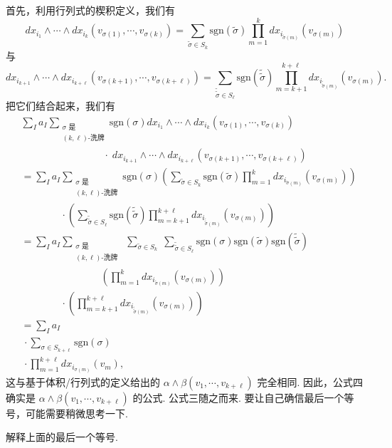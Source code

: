 首先，利用行列式的楔积定义，我们有
\[
dx_{i_1}\wedge\cdots\wedge dx_{i_k}(v_{\sigma(1)},\cdots,v_{\sigma(k)})
=\sum_{\tilde{\sigma}\in S_k}\mathrm{sgn}(\tilde{\sigma})\prod_{m=1}^{k}dx_{i_{\tilde{\sigma}(m)}}(v_{\sigma(m)})
\]
与
\[
dx_{i_{k+1}}\wedge\cdots\wedge dx_{i_{k+\ell}}(v_{\sigma(k+1)},\cdots,v_{\sigma(k+\ell)})
=\sum_{\tilde{\tilde{\sigma}}\in S_\ell}\mathrm{sgn}(\tilde{\tilde{\sigma}})\prod_{m=k+1}^{k+\ell}dx_{i_{\tilde{\tilde{\sigma}}(m)}}(v_{\sigma(m)}).
\]
把它们结合起来，我们有
\begin{align*}
&\sum_{I}a_I\sum_{\substack{\sigma\text{ 是}\\ (k,\ell)\text{-洗牌}}}\mathrm{sgn}(\sigma)
dx_{i_1}\wedge\cdots\wedge dx_{i_k}(v_{\sigma(1)},\cdots,v_{\sigma(k)})\\
&\qquad\qquad\qquad\qquad\;\cdot\;dx_{i_{k+1}}\wedge\cdots\wedge dx_{i_{k+\ell}}(v_{\sigma(k+1)},\cdots,v_{\sigma(k+\ell)})\\
&=\sum_{I}a_I\sum_{\substack{\sigma\text{ 是}\\ (k,\ell)\text{-洗牌}}}\mathrm{sgn}(\sigma)
\left(\sum_{\tilde{\sigma}\in S_k}\mathrm{sgn}(\tilde{\sigma})\prod_{m=1}^{k}dx_{i_{\tilde{\sigma}(m)}}(v_{\sigma(m)})\right)\\
&\qquad\qquad\cdot
\left(\sum_{\tilde{\tilde{\sigma}}\in S_\ell}\mathrm{sgn}(\tilde{\tilde{\sigma}})\prod_{m=k+1}^{k+\ell}dx_{i_{\tilde{\tilde{\sigma}}(m)}}(v_{\sigma(m)})\right)\\
&=\sum_{I}a_I\sum_{\substack{\sigma\text{ 是}\\ (k,\ell)\text{-洗牌}}}\;\sum_{\tilde{\sigma}\in S_k}\;\sum_{\tilde{\tilde{\sigma}}\in S_\ell}
\mathrm{sgn}(\sigma)\mathrm{sgn}(\tilde{\sigma})\mathrm{sgn}(\tilde{\tilde{\sigma}})\\
&\qquad\qquad\qquad\qquad\left(\prod_{m=1}^{k}dx_{i_{\tilde{\sigma}(m)}}(v_{\sigma(m)})\right)\\
&\qquad\qquad\cdot\left(\prod_{m=k+1}^{k+\ell}dx_{i_{\tilde{\tilde{\sigma}}(m)}}(v_{\sigma(m)})\right)\\
&=\sum_{I}a_I\\
&\,\cdot\sum_{\sigma\in S_{k+\ell}}\mathrm{sgn}(\sigma)\\
&\,\cdot\prod_{m=1}^{k+\ell}dx_{i_{\sigma(m)}}(v_m),
\end{align*}
这与基于体积/行列式的定义给出的 $\alpha\wedge\beta(v_1,\cdots,v_{k+\ell})$ 完全相同. 因此，公式四确实是 $\alpha\wedge\beta(v_1,\cdots,v_{k+\ell})$ 的公式. 公式三随之而来. 要让自己确信最后一个等号，可能需要稍微思考一下.

\begin{question}\label{q:3-20}
解释上面的最后一个等号.
\end{question}

